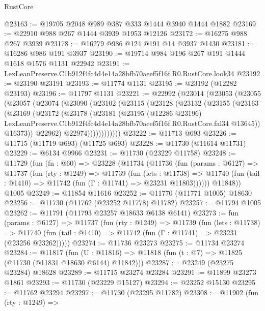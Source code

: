 \begin{lexlean}{RustCore}
\begin{coremodule}
@23163 := @19705 @2048 @989 @387 @333 @1444 @3940 @1444 @1882
@23169 := @22910 @988 @267 @1444 @3939 @1953 @12126
@23172 := @16275 @988 @267 @3939
@23178 := @16279 @986 @124 @191 @14 @3937 @1430
@23181 := @16286 @986 @191 @3937
@23190 := @19714 @984 @196 @267 @191 @1444 @1618 @1576 @1131 @22942
@23191 := LexLeanPreserve.C1b912f4fc4d4e14a28bfb70aeef5f16f.R0.RustCore.look34
@23192 := @23190 @23191
@23193 := @11774 @1131
@23195 := @23192 (@12282 @23193)
@23196 := @11797 @1131
@23221 := @22992
    (@23014
      (@23053
        (@23055
          (@23057
            (@23074
              (@23090
                (@23102
                  (@23115
                    (@23128
                      (@23132
                        (@23155
                          (@23163
                            (@23169
                              (@23172
                                (@23178
                                  (@23181
                                    (@23195
                                      (@12286 @23196)
                                      LexLeanPreserve.C1b912f4fc4d4e14a28bfb70aeef5f16f.R0.RustCore.fal34
                                      @13645))
                                  @16373))
                              @22962)
                            @22974))))))))))))
@23222 := @11713 @693
@23226 := @11715 (@11719 @693) (@11725 @693)
@23228 := @11730 (@11614 @11731)
@23229 := @6134 @9966
@23231 := @11730 (@23229 @11758)
@23248 := @11729
    (fun (fn : @60) =>
    @23228
      (@11734
        (@11736
          (fun (params : @6127) =>
          @11737
            (fun (rty : @1249) =>
            @11739
              (fun (lets : @11738) =>
              @11740 (fun (tail : @1410) => @11742 (fun (Γ : @11741) => @23231 @11803))))))
        @11848))
    @1005
@23249 := @11854 @11616
@23252 := @11770 (@11771 @1005) @18630
@23256 := @11730 (@11762 (@23252 @11778) @11782)
@23257 := @11794 @1005
@23262 := @11791 (@11793 @23257 @18633 @6138 @6141)
@23273 := fun (params : @6127) =>
  @11737
    (fun (rty : @1249) =>
    @11739
      (fun (lets : @11738) =>
      @11740 (fun (tail : @1410) => @11742 (fun (Γ : @11741) => @23231 (@23256 @23262)))))
@23274 := @11736 @23273
@23275 := @11734 @23274
@23284 := @11817
    (fun (U : @11816) => @11818 (fun (t : @7) => @11825 (@11730 (@11831 @18630 @6144) @11842)))
@23287 := @23249 (@23275 @23284) @18628
@23289 := @11715 @23274 @23284
@23291 := @11899 @23273 @1861
@23293 := @11730 (@23229 @15127)
@23294 := @23252 @15130
@23295 := @11762 @23294
@23297 := @11730 (@23295 @11782)
@23308 := @11902
    (fun (rty : @1249) =>

\end{coremodule}
\end{lexlean}
